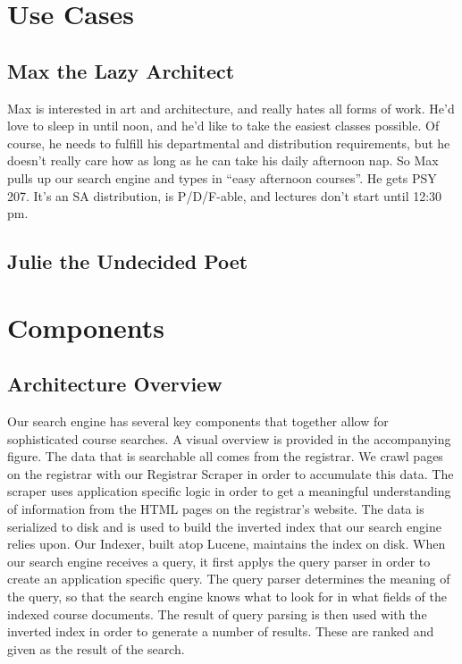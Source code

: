 \documentclass[12pt,letterpaper]{article}
\begin{document}
\section{Use Cases}
\subsection{Max the Lazy Architect}
Max is interested in art and architecture, and really hates all forms of work. He'd love to sleep in until noon, and he'd like to take the easiest classes possible. Of course, he needs to fulfill his departmental and distribution requirements, but he doesn't really care how as long as he can take his daily afternoon nap. So Max pulls up our search engine and types in ``easy afternoon courses''. He gets PSY 207. It's an SA distribution, is P/D/F-able, and lectures don't start until 12:30 pm.   
		
\subsection{Julie the Undecided Poet}

\section{Components}

\subsection{Architecture Overview}
Our search engine has several key components that together allow for sophisticated course searches. A visual overview is provided in the accompanying figure. The data that is searchable all comes from the registrar. We crawl pages on the registrar with our Registrar Scraper in order to accumulate this data. The scraper uses application specific logic in order to get a meaningful understanding of information from the HTML pages on the registrar's website. The data is serialized to disk and is used to build the inverted index that our search engine relies upon. Our Indexer, built atop Lucene, maintains the index on disk. When our search engine receives a query, it first applys the query parser in order to create an application specific query. The query parser determines the meaning of the query, so that the search engine knows what to look for in what fields of the indexed course documents. The result of query parsing is then used with the inverted index in order to generate a number of results. These are ranked and given as the result of the search.
\end{document}
